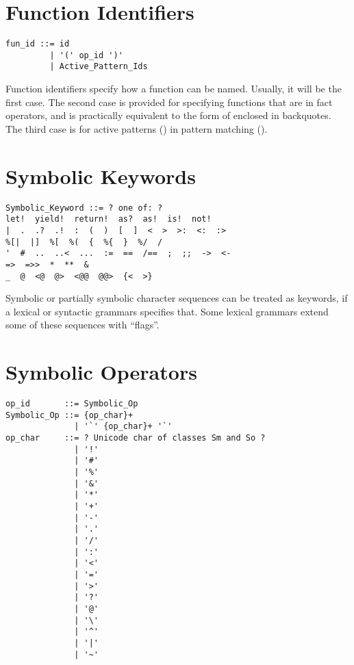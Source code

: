 \section{Function Identifiers}
\label{sec:function-identifiers}

\syntax\begin{lstlisting}
fun_id ::= id
         | '(' op_id ')'
         | Active_Pattern_Ids
\end{lstlisting}

Function identifiers specify how a function can be named. Usually, it will be the first case. The second case is provided for specifying functions that are in fact operators, and is practically equivalent to the form of  enclosed in backquotes. The third case is for active patterns () in pattern matching (). 





\section{Symbolic Keywords}
\label{sec:symbolic-keywords}

\syntax\begin{lstlisting}[deletekeywords={of}]
Symbolic_Keyword ::= ? one of: ?
let!  yield!  return!  as?  as!  is!  not!
|  .  .?  .!  :  (  )  [  ]  <  >  >:  <:  :>
%[|  |]  %[  %(  {  %{  }  %/  /
'  #  ..  ..<  ...  :=  ==  /==  ;  ;;  ->  <-
=>  =>>  *  **  &
_  @  <@  @>  <@@  @@>  {<  >}
\end{lstlisting}

Symbolic or partially symbolic character sequences can be treated as keywords, if a lexical or syntactic grammars specifies that. Some lexical grammars extend some of these sequences with ``flags''. 





\section{Symbolic Operators}
\label{sec:symbolic-operators}

\syntax\begin{lstlisting}[deletekeywords={of,and}]
op_id       ::= Symbolic_Op
Symbolic_Op ::= {op_char}+
              | '`' {op_char}+ '`'
op_char     ::= ? Unicode char of classes Sm and So ?
              | '!'
              | '#'
              | '%'
              | '&'
              | '*'
              | '+'
              | '-'
              | '.'
              | '/'
              | ':'
              | '<'
              | '='
              | '>'
              | '?'
              | '@'
              | '\'
              | '^'
              | '|'
              | '~'
\end{lstlisting}

